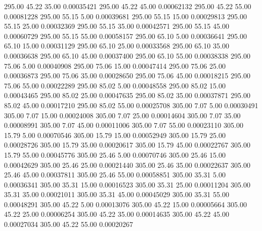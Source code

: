     295.00     45.22     35.00     0.00035421
    295.00     45.22     45.00     0.00062132
    295.00     45.22     55.00     0.00081228
    295.00     55.15      5.00     0.00039681
    295.00     55.15     15.00     0.00029813
    295.00     55.15     25.00     0.00032369
    295.00     55.15     35.00     0.00042571
    295.00     55.15     45.00     0.00060729
    295.00     55.15     55.00     0.00058157
    295.00     65.10      5.00     0.00036641
    295.00     65.10     15.00     0.00031129
    295.00     65.10     25.00     0.00033568
    295.00     65.10     35.00     0.00036638
    295.00     65.10     45.00     0.00037400
    295.00     65.10     55.00     0.00038338
    295.00     75.06      5.00     0.00040908
    295.00     75.06     15.00     0.00047414
    295.00     75.06     25.00     0.00036873
    295.00     75.06     35.00     0.00028650
    295.00     75.06     45.00     0.00018215
    295.00     75.06     55.00     0.00022289
    295.00     85.02      5.00     0.00048558
    295.00     85.02     15.00     0.00043465
    295.00     85.02     25.00     0.00047635
    295.00     85.02     35.00     0.00037871
    295.00     85.02     45.00     0.00017210
    295.00     85.02     55.00     0.00025708
    305.00      7.07      5.00     0.00030491
    305.00      7.07     15.00     0.00024008
    305.00      7.07     25.00     0.00014604
    305.00      7.07     35.00     0.00008991
    305.00      7.07     45.00     0.00011006
    305.00      7.07     55.00     0.00023110
    305.00     15.79      5.00     0.00070546
    305.00     15.79     15.00     0.00052949
    305.00     15.79     25.00     0.00028726
    305.00     15.79     35.00     0.00020617
    305.00     15.79     45.00     0.00022767
    305.00     15.79     55.00     0.00045776
    305.00     25.46      5.00     0.00070746
    305.00     25.46     15.00     0.00042629
    305.00     25.46     25.00     0.00021440
    305.00     25.46     35.00     0.00022637
    305.00     25.46     45.00     0.00037811
    305.00     25.46     55.00     0.00058851
    305.00     35.31      5.00     0.00036341
    305.00     35.31     15.00     0.00016523
    305.00     35.31     25.00     0.00011204
    305.00     35.31     35.00     0.00021011
    305.00     35.31     45.00     0.00045029
    305.00     35.31     55.00     0.00048291
    305.00     45.22      5.00     0.00013076
    305.00     45.22     15.00     0.00005664
    305.00     45.22     25.00     0.00006254
    305.00     45.22     35.00     0.00014635
    305.00     45.22     45.00     0.00027034
    305.00     45.22     55.00     0.00020267
